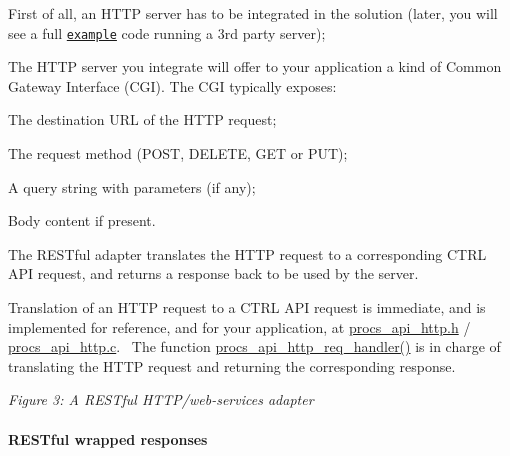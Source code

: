 \begin{DoxyItemize}
\item First of all, an H\+T\+TP server has to be integrated in the solution (later, you will see a full \href{md_EXAMPLES.html}{\tt example} code running a 3rd party server);
\item The H\+T\+TP server you integrate will offer to your application a kind of Common Gateway Interface (C\+GI). The C\+GI typically exposes\+:
\begin{DoxyItemize}
\item The destination U\+RL of the H\+T\+TP request;
\item The request method (P\+O\+ST, D\+E\+L\+E\+TE, G\+ET or P\+UT);
\item A query string with parameters (if any);
\item Body content if present.
\end{DoxyItemize}
\item The R\+E\+S\+Tful adapter translates the H\+T\+TP request to a corresponding C\+T\+RL A\+PI request, and returns a response back to be used by the server.
\end{DoxyItemize}

Translation of an H\+T\+TP request to a C\+T\+RL A\+PI request is immediate, and is implemented for reference, and for your application, at \hyperlink{procs__api__http_8h}{procs\+\_\+api\+\_\+http.\+h} / \hyperlink{procs__api__http_8c}{procs\+\_\+api\+\_\+http.\+c}.~\newline
 The function \textquotesingle{}\hyperlink{procs__api__http_8c_af95ab7d53c13d03d65d8cd0dacd3463f}{procs\+\_\+api\+\_\+http\+\_\+req\+\_\+handler()}\textquotesingle{} is in charge of translating the H\+T\+TP request and returning the corresponding response.~\newline


 {\itshape Figure 3\+: A R\+E\+S\+Tful H\+T\+T\+P/web-\/services adapter}

\paragraph*{R\+E\+S\+Tful wrapped responses}

